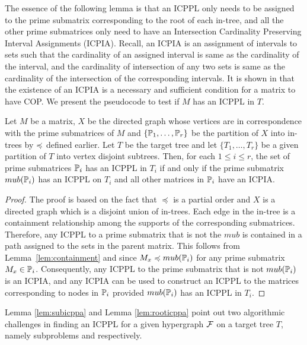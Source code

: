 The essence of the following lemma is that an ICPPL only needs to be
assigned to the prime submatrix corresponding to the root of each
in-tree, and all the other prime submatrices only need to have an
Intersection Cardinality Preserving Interval Assignments (ICPIA).
Recall, an ICPIA is an assignment of intervals to sets such that the
cardinality of an assigned interval is same as the cardinality of the
interval, and the cardinality of intersection of any two sets is same
as the cardinality of the intersection of the corresponding intervals.
It is shown in \cite{nsnrs09} that the existence of an ICPIA is a
necessary and sufficient condition for a matrix to have COP.  We
present the pseudocode to test if $M$ has an ICPPL in $T$.

\begin{lemma} 
  \label{lem:rooticppa}%
  Let $M$ be a matrix, $X$ be the directed graph whose vertices are in
  correspondence with the prime submatrices of $M$ and
  $\{\mathbb P_1,\ldots,\mathbb P_r\}$ be the partition of $X$ into in-trees by
  $\preccurlyeq$ defined earlier.  Let $T$ be the target tree and let
  $\{T_1, \ldots, T_r\}$ be a given partition of $T$ into vertex
  disjoint subtrees.  Then, for each $1 \leq i \leq r$, the set of
  prime submatrices $\mathbb P_i$ has an ICPPL in $T_i$ if and only if the
  prime submatrix $mub(\mathbb P_i)$ has an ICPPL on $T_i$ and all other
  matrices in $\mathbb P_i$ have an ICPIA.
\end{lemma}
\begin{proof}\thesisspacing
  The proof is based on the fact that $\preccurlyeq$ is a partial
  order and $X$ is a directed graph which is a disjoint union of
  in-trees.  Each edge in the in-tree is a containment relationship
  among the supports of the corresponding submatrices. Therefore, any
  ICPPL to a prime submatrix that is not the $mub$ is contained in a
  path assigned to the sets in the parent matrix.  This follows from
  Lemma~\ref{lem:containment} and since $M_x \preccurlyeq mub(\mathbb P_i)$
  for any prime submatrix $M_x \in \mathbb P_i$.  Consequently, any ICPPL to
  the prime submatrix that is not $mub(\mathbb P_i)$ is an ICPIA, and any
  ICPIA can be used to construct an ICPPL to the matrices
  corresponding to nodes in $\mathbb P_i$ provided $mub(\mathbb P_i)$ has
  an ICPPL in $T_i$. 
\end{proof}
Lemma \ref{lem:subicppa} and Lemma \ref{lem:rooticppa} point out two
algorithmic challenges in finding an ICPPL for a given hypergraph
${\cal F}$ on a target tree $T$, namely subproblems \FOCPS and \FMFT respectively.


